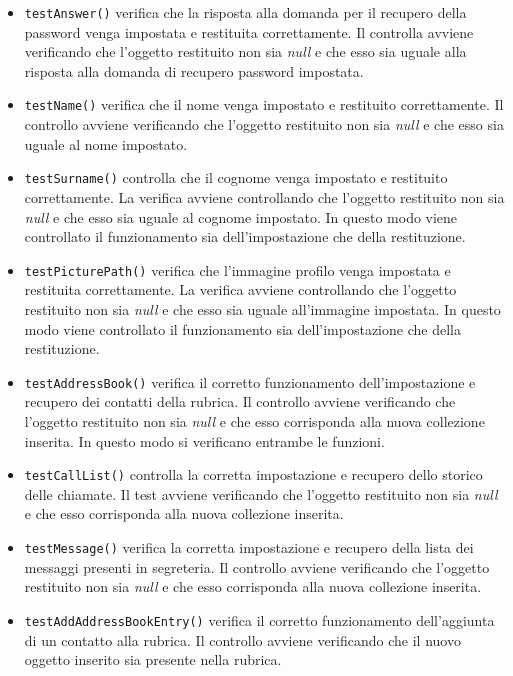 \begin{itemize}
\begin{itemize}
\item \texttt{testAnswer()} verifica che la risposta alla domanda per il recupero della password venga impostata e restituita correttamente. Il controlla avviene verificando che l'oggetto restituito non sia \textit{null} e che esso sia uguale alla risposta alla domanda di recupero password impostata. 

\item \texttt{testName()} verifica che il nome venga impostato e restituito correttamente. Il controllo avviene verificando che l'oggetto restituito non sia \textit{null} e che esso sia uguale al nome impostato.

\item \texttt{testSurname()} controlla che il cognome venga impostato e restituito correttamente. La verifica avviene controllando che l'oggetto restituito non sia \textit{null} e che esso sia uguale al cognome impostato. In questo modo viene controllato il funzionamento sia dell'impostazione che della restituzione.

\item \texttt{testPicturePath()} verifica che l'immagine profilo venga impostata e restituita correttamente. La verifica avviene controllando che l'oggetto restituito non sia \textit{null} e che esso sia uguale all'immagine impostata. In questo modo viene controllato il funzionamento sia dell'impostazione che della restituzione.

\item \texttt{testAddressBook()} verifica il corretto funzionamento dell'impostazione e recupero dei contatti della rubrica.
Il controllo avviene verificando che l'oggetto restituito non sia \textit{null} e che esso corrisponda alla nuova collezione inserita.
In questo modo si verificano entrambe le funzioni.

\item \texttt{testCallList()} controlla la corretta impostazione e recupero dello storico delle chiamate.
Il test avviene verificando che l'oggetto restituito non sia \textit{null} e che esso corrisponda alla nuova collezione inserita.

\item \texttt{testMessage()} verifica la corretta impostazione e recupero della lista dei messaggi presenti in segreteria.
Il controllo avviene verificando che l'oggetto restituito non sia \textit{null} e che esso corrisponda alla nuova collezione inserita.

\item \texttt{testAddAddressBookEntry()} verifica il corretto funzionamento dell'aggiunta di un contatto alla rubrica.
Il controllo avviene verificando che il nuovo oggetto inserito sia presente nella rubrica.


\end{itemize}
\end{itemize}
